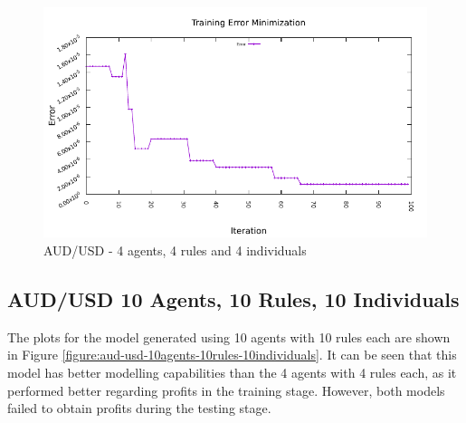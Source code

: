 \begin{figure}[htp]
  \medskip

  \includegraphics[width=.45\textwidth]{img/plots/aud_usd_h1-4agents-4rules-4ind-100gen_error_minimization.pdf}

  \caption{AUD/USD - 4 agents, 4 rules and 4 individuals}
  \label{figure:aud-usd-4agents-4rules-4individuals}
\end{figure}

\newpage

\subsection{AUD/USD 10 Agents, 10 Rules, 10 Individuals}
\label{results:forecast-aud-usd-10agents-10rules-10individuals}

The plots for the model generated using 10 agents with 10 rules each are shown
in Figure \ref{figure:aud-usd-10agents-10rules-10individuals}. It can be seen
that this model has better modelling capabilities than the 4 agents with 4 rules
each, as it performed better regarding profits in the training stage. However,
both models failed to obtain profits during the testing stage.

